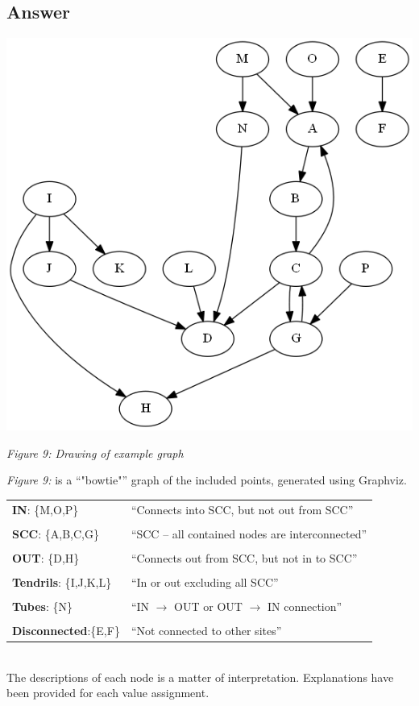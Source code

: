\newpage
\vspace*{5pt}
\subsection{Answer}
\begin{center}
	\includegraphics[scale=0.75]{Q3/fig1.png}\\
	\centerline{\textit{Figure 9: Drawing of example graph}}
\end{center}

\textit{Figure 9:} is a \enquote{"bow\-tie"}\cite{bow-tie} graph of the included points, generated using Graphviz\cite{graph}. 

\vspace{5mm}
\begin{tabular}{l l}
	\textbf{IN}: \{\textsc{M,O,P}\} & \enquote{Connects into SCC, but not out from SCC}\\
	\\
	\textbf{SCC}: \{\textsc{A,B,C,G}\} &\enquote{SCC -- all contained nodes are interconnected}\\
	\\
	\textbf{OUT}: \{\textsc{D,H}\} & \enquote{Connects out from SCC, but not in to SCC}\\
	\\
	\textbf{Tendrils}: \{\textsc{I,J,K,L}\} & \enquote{In or out excluding all SCC}\\
	\\
	\textbf{Tubes}: \{\textsc{N}\}& \enquote{IN $\to$ OUT or OUT $\to$ IN connection}\\
	\\
	\textbf{Disconnected}:\{\textsc{E,F}\} & \enquote{Not connected to other sites}\\
\end{tabular}
\\
\vspace{5mm}
The descriptions of each node is a matter of interpretation.  Explanations have been provided for each value assignment.

